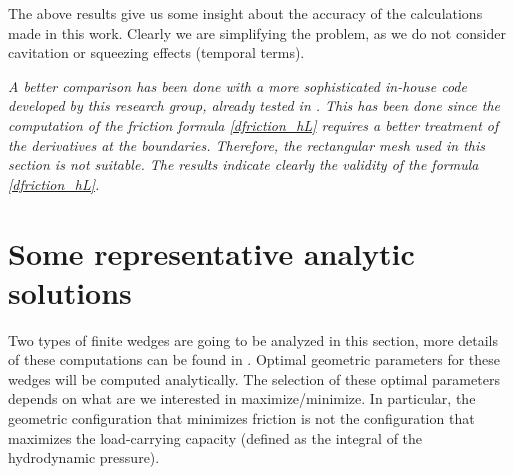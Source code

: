 The above results give us some insight about the accuracy of the calculations made in this work. Clearly we are simplifying the problem, as we do not consider cavitation or squeezing effects (temporal terms).

\begin{remark}
\it A better comparison has been done with a more sophisticated in-house code developed by this research group, already tested in \cite{buscaglia_varform,aus_simeoni_busc}. This has been done since the computation of the friction formula \eqref*{dfriction_hL} requires a better treatment of the derivatives at the boundaries. Therefore, the rectangular mesh used in this section is not suitable. The results indicate clearly the validity of the formula \eqref*{dfriction_hL}.
\end{remark}

\section{Some representative analytic solutions}
\label{sec:repre_analityc_sol}
Two types of finite wedges are going to be analyzed in this section, more details of these computations can be found in \cite{cameron1971}. Optimal geometric parameters for these wedges will be computed analytically. The selection of these optimal parameters depends on what are we interested in maximize/minimize.  In particular, the geometric configuration that minimizes friction is not the configuration that maximizes the load-carrying capacity (defined as the integral of the hydrodynamic pressure).
